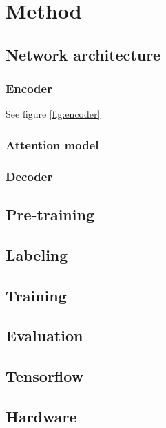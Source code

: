 \section{Method}

\subsection{Network architecture}

\subsubsection{Encoder}



See figure \ref{fig:encoder}

\subsubsection{Attention model}

\subsubsection{Decoder}



\subsection{Pre-training}
\subsection{Labeling}
\subsection{Training}
\subsection{Evaluation}


\subsection{Tensorflow}

\subsection{Hardware}
